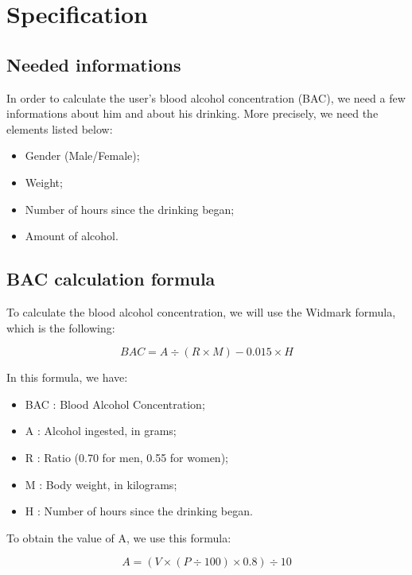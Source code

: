 \section{Specification}
\label{sec:spec}

\subsection{Needed informations}
\label{ssec:info} 

In order to calculate the user's blood alcohol concentration (BAC), we need a few informations about him and about his drinking. More precisely, we need the elements listed below:

\begin{itemize}[noitemsep]
\item Gender (Male/Female);
\item Weight;
\item Number of hours since the drinking began; 
\item Amount of alcohol.
\end{itemize}

\subsection{BAC calculation formula}
\label{ssec:formula}

To calculate the blood alcohol concentration, we will use the Widmark formula, which is the following:

\begin{equation}
   BAC = A \div (R \times M) - 0.015 \times H
\end{equation}
   
In this formula, we have:

\begin{itemize}[noitemsep]
\item BAC : Blood Alcohol Concentration;
\item A : Alcohol ingested, in grams;
\item R : Ratio (0.70 for men, 0.55 for women);
\item M : Body weight, in kilograms;
\item H : Number of hours since the drinking began.
\end{itemize}

To obtain the value of A, we use this formula:

\begin{equation}
   A = (V \times (P \div 100) \times 0.8) \div 10
\end{equation}

